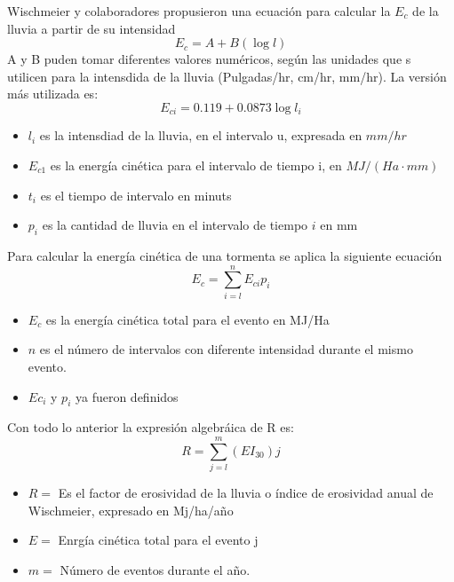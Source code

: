     Wischmeier y colaboradores propusieron una ecuación para calcular la $E_c$ de la lluvia a partir de su intensidad
    \begin{equation}
        E_c = A + B\left(\log{l} \right)
    \end{equation}
    A y B puden tomar diferentes valores numéricos, según las unidades que s utilicen para la intensdida de la lluvia (Pulgadas/hr, cm/hr, mm/hr). La versión más utilizada es:
    \begin{equation}
        E_{ci} = 0.119 + 0.0873 \log{l_i} 
    \end{equation}
    \begin{notation}
        \begin{itemize}
            \item $l_i$ es la intensdiad de la lluvia, en el intervalo u, expresada en $mm/hr$
            \item $E_{c1}$ es la energía cinética para el intervalo de tiempo i, en $MJ/(Ha\cdot mm)$
            \item $t_i$ es el tiempo de intervalo en minuts
            \item $p_i$ es la cantidad de lluvia en el intervalo de tiempo $i$ en mm
        \end{itemize}
    \end{notation}
    Para calcular la energía cinética de una tormenta se aplica la siguiente ecuación
    \begin{equation}
        E_c =\sum_{i = l}^n E_{ci}p_i
    \end{equation}
    \begin{notation}
        \begin{itemize}
            \item $E_c$ es la energía cinética total para el evento en MJ/Ha
            \item $n$ es el número de intervalos con diferente intensidad durante el mismo evento.
            \item $Ec_i$ y $p_i$ ya fueron definidos
        \end{itemize}
    \end{notation}
    Con todo lo anterior la expresión algebráica de R es:
    \begin{equation}
        R=\sum_{j= l}^m (EI_{30})j
    \end{equation}
    \begin{notation}
        \begin{itemize}
            \item $R=$ Es el factor de erosividad de la lluvia o índice de erosividad anual de Wischmeier, expresado en Mj/ha/año
            \item $E=$ Enrgía cinética total para el evento j
            \item $m=$ Número de eventos durante el año.
        \end{itemize}
    \end{notation}
        
